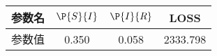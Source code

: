 \begin{tabular}{cccc}
\hline
参数名&$\P{S}{I}$&$\P{I}{R}$&LOSS\\
\hline
参数值&0.350&0.058&2333.798\\
\hline
\end{tabular}